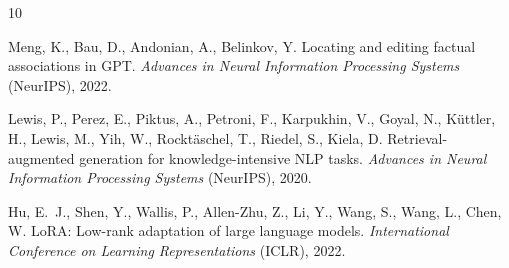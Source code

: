 \documentclass[preprint,12pt]{elsarticle}
\begin{document}

\begin{thebibliography}{10}

Meng, K., Bau, D., Andonian, A., Belinkov, Y. Locating and editing factual
associations in GPT. \emph{Advances in Neural Information Processing Systems}
(NeurIPS), 2022.

Lewis, P., Perez, E., Piktus, A., Petroni, F., Karpukhin, V., Goyal, N., K\"uttler, H.,
Lewis, M., Yih, W., Rockt\"aschel, T., Riedel, S., Kiela, D. Retrieval-augmented
generation for knowledge-intensive NLP tasks. \emph{Advances in Neural Information
Processing Systems} (NeurIPS), 2020.

Hu, E.~J., Shen, Y., Wallis, P., Allen-Zhu, Z., Li, Y., Wang, S., Wang, L., Chen, W.
LoRA: Low-rank adaptation of large language models. \emph{International Conference on
Learning Representations} (ICLR), 2022.

\end{thebibliography}
\end{document}
